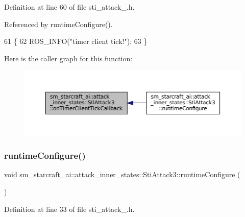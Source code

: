Definition at line 60 of file sti\+\_\+attack\+\_.\+h.



Referenced by runtime\+Configure().


\begin{DoxyCode}
61   \{
62     ROS\_INFO(\textcolor{stringliteral}{"timer client tick!"});
63   \}
\end{DoxyCode}
Here is the caller graph for this function\+:
\nopagebreak
\begin{figure}[H]
\begin{center}
\leavevmode
\includegraphics[width=350pt]{structsm__starcraft__ai_1_1attack__inner__states_1_1StiAttack3_afb25dc151281ba1422efe43a7d9e57d7_icgraph}
\end{center}
\end{figure}
\mbox{\label{structsm__starcraft__ai_1_1attack__inner__states_1_1StiAttack3_a540d7311712db7ce0310910de4b5cc31}} 
\subsubsection{\texorpdfstring{runtime\+Configure()}{runtimeConfigure()}}
{\footnotesize\ttfamily void sm\+\_\+starcraft\+\_\+ai\+::attack\+\_\+inner\+\_\+states\+::\+Sti\+Attack3\+::runtime\+Configure (\begin{DoxyParamCaption}{ }\end{DoxyParamCaption})\hspace{0.3cm}{\ttfamily [inline]}}



Definition at line 33 of file sti\+\_\+attack\+\_.\+h.



